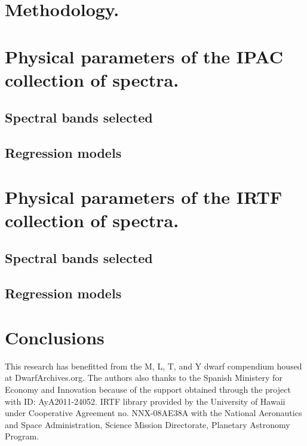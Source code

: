 \documentclass[referee]{aa}
\begin{document}




\section{Methodology.}


\section{Physical parameters of the IPAC collection of spectra.}

\subsection{Spectral bands selected}

\subsection{Regression models}


\section{Physical parameters of the IRTF collection of spectra.}

\subsection{Spectral bands selected}

\subsection{Regression models}


\section{Conclusions}

\begin{acknowledgements}
This research has benefitted from the M, L, T, and Y dwarf compendium housed at DwarfArchives.org.
The authors also thanks to the Spanish Ministery for Economy and Innovation because of the 
support obtained through the project with ID: AyA2011-24052. IRTF library provided by the 
University of Hawaii under Cooperative Agreement no. NNX-08AE38A with the National 
Aeronautics and Space Administration, Science Mission Directorate, Planetary Astronomy Program.
\end{acknowledgements}


{}

\end{document}
